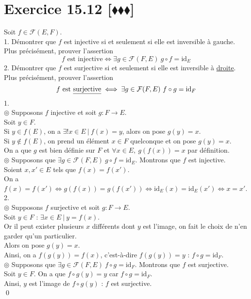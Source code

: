 \documentclass[10pt]{article}
\begin{document}
\section*{Exercice 15.12 [$\blacklozenge\blacklozenge\blacklozenge$]}
\begin{tcolorbox}[enhanced, width=7.6in, center, size=fbox, fontupper=\large, drop shadow southwest]
    Soit $f \in \mathcal{F}(E,F)$.\\
    1. Démontrer que $f$ est injective si et seulement si elle est inversible à gauche.\\
    Plus précisément, prouver l'assertion
    \begin{equation*}
        f \text{ est injective} \iff \exists g \in \mathcal{F}(F,E) ~ g \circ f = \text{id}_E
    \end{equation*}
    2. Démontrer que $f$ est surjective si et seulement si elle est inversible à \underline{droite}.\\
    Plus précisément, prouver l'assertion
    \begin{equation*}
        f \text{ est \underline{surjective}} \iff \exists g \in \mathcal{F}(F,E) ~ f \circ g = \text{id}_F 
    \end{equation*}
    1.\\
    $\circledcirc$ Supposons $f$ injective et soit $g:F\to E$.\\
    Soit $y \in F$.\\
    Si $y\in f(E)$, on a $\exists!x\in E ~ | ~ f(x) = y$, alors on pose $g(y)=x$.\\
    Si $y\notin f(E)$, on prend un élément $x\in F$ quelconque et on pose $g(y)=x$.\\
    On a que $g$ est bien définie sur $F$ et $\forall x \in E, ~ g(f(x))=x$ par définition.\\[0.15cm]
    $\circledcirc$ Supposons que $\exists g \in \mathcal{F}(F, E) ~ g \circ f = \text{id}_E$. Montrons que $f$ est injective.\\
    Soient $x,x'\in E$ tels que $f(x)=f(x')$.\\
    On a $f(x)=f(x') \iff g(f(x))=g(f(x')) \iff \text{id}_E(x) = \text{id}_E(x') \iff x = x'$.\\[0.2cm]
    2.\\
    $\circledcirc$ Supposons $f$ surjective et soit $g:F\to E$.\\
    Soit $y \in F$ : $\exists x \in E ~ | ~ y = f(x)$.\\
    Or il peut exister plusieurs $x$ différents dont $y$ est l'image, on fait le choix de n'en garder qu'un particulier.\\
    Alors on pose $g(y) = x$.\\
    Ainsi, on a $f(g(y)) = f(x)$, c'est-à-dire $f(g(y))=y$ : $f\circ g = \text{id}_F$.\\[0.15cm]
    $\circledcirc$ Supposons que $\exists g \in \mathcal{F}(F, E) ~ f \circ g = \text{id}_F$. Montrons que $f$ est surjective.\\
    Soit $y \in F$. On a que $f\circ g(y) = y$ car $f \circ g = \text{id}_F$.\\
    Ainsi, $y$ est l'image de $f\circ g(y)$ : $f$ est surjective.\\
    \qed
\end{tcolorbox}
\end{document}
